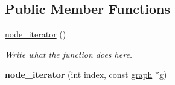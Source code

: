 \subsection*{Public Member Functions}
\begin{DoxyCompactItemize}
\item 
\hyperlink{classgraph_1_1node__iterator_a8749708047c6b46e6fe6bbbffc906645}{node\+\_\+iterator} ()
\begin{DoxyCompactList}\small\item\em Write what the function does here. \end{DoxyCompactList}\item 
\hypertarget{classgraph_1_1node__iterator_af4cd87022aa1ab0b8f4d0a7088674142}{{\bfseries node\+\_\+iterator} (int index, const \hyperlink{classgraph}{graph} $\ast$g)}\label{classgraph_1_1node__iterator_af4cd87022aa1ab0b8f4d0a7088674142}


\end{DoxyCompactItemize}
